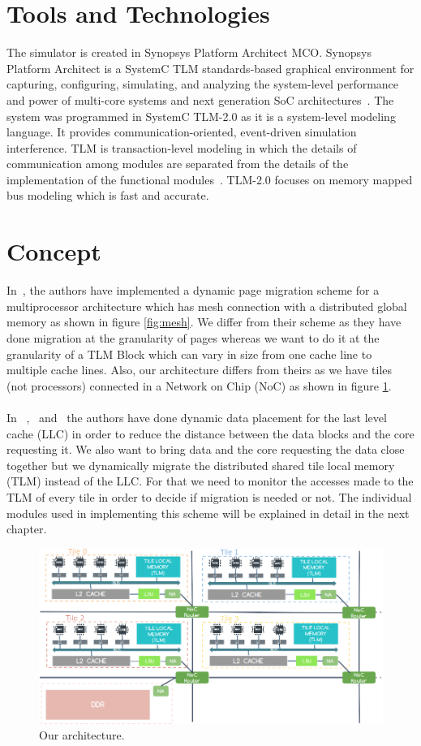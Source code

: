 \documentclass{listhesis}
\begin{document}
\section{Tools and Technologies}
The simulator is created in Synopsys Platform Architect MCO. Synopsys Platform Architect is a SystemC TLM standards-based graphical environment for capturing, configuring, simulating, and analyzing the system-level performance and power of multi-core systems and next generation SoC architectures~\cite{synopsys}.
The system was programmed in SystemC TLM-2.0 as it is a system-level modeling language. It provides communication-oriented, event-driven simulation interference. TLM is transaction-level modeling in which the details of communication among modules are separated from the details of the implementation of the functional modules~\cite{tlm}. TLM-2.0 focuses on memory mapped bus modeling which is fast and accurate.
\section{Concept}
In~\cite{dynamicPageMigration}, the authors have implemented a dynamic page migration scheme for a multiprocessor architecture which has mesh connection with a distributed global memory as shown in figure \ref{fig:mesh}. We differ from their scheme as they have done migration at the granularity of pages whereas we want to do it at the granularity of a TLM Block which can vary in size from one cache line to multiple cache lines. Also, our architecture differs from theirs as we have tiles (not processors) connected in a Network on Chip (NoC) as shown in figure \ref{fig:processor}.\\
\\
In ~\cite{cacheDataPlacement1},~\cite{cacheDataPlacement3} and~\cite{cacheDataPlacement4} the authors have done dynamic data placement for the last level cache (LLC) in order to reduce the distance between the data blocks and the core requesting it. We also want to bring data and the core requesting the data close together but we dynamically migrate the distributed shared tile local memory (TLM) instead of the LLC. For that we need to monitor the accesses made to the TLM of every tile in order to decide if migration is needed or not. The individual modules used in implementing this scheme will be explained in detail in the next chapter.\\
\begin{figure}
  \includegraphics[width=\linewidth]{processor.png}
  \centering
  \caption{Our architecture.}
  \label{fig:processor}
\end{figure}
\end{document}
